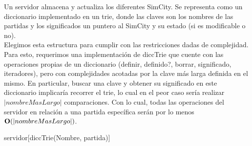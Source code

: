 \begin{Representacion}
  
  
    Un servidor almacena y actualiza los diferentes SimCity. Se representa como un 
    diccionario implementado en un trie, donde las claves son los nombres de las partidas
    y los significados un puntero al SimCity y su estado (si es modificable o no).\\

    Elegimos esta estructura para cumplir con las restricciones dadas de complejidad. Para esto, requerimos una implementación de
    diccTrie que cuente con las operaciones propias de un diccionario (definir, definido?, borrar, significado, iteradores), 
    pero con complejidades acotadas por la clave más larga definida en el mismo. En particular, buscar una clave y obtener su significado 
    en este diccionario implicaría recorrer el trie, lo cual en el peor caso sería realizar $|nombreMasLargo|$ comparaciones. 
    Con lo cual, todas las operaciones del servidor en relación a una partida específica serán por lo menos $\bold{O}(|nombreMasLargo|)$.

    

    \begin{Estructura}{servidor}[diccTrie(Nombre, partida)]
        \begin{Tupla}[partida]
        \end{Tupla}

    \end{Estructura}
    
    \vspace{2mm}
    \vspace{2mm}

    ~
    

\end{Representacion}
